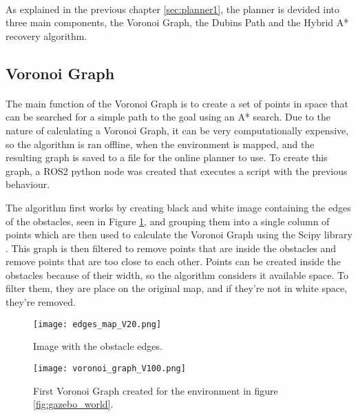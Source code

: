 \paragraph{}As explained in the previous chapter \ref{sec:planner1}, 
the planner is devided into three main components, the Voronoi Graph, the Dubins Path and the Hybrid A* recovery algorithm.

\subsection{Voronoi Graph}
\label{subsec:voronoi_graph}

\paragraph{}The main function of the Voronoi Graph is to create a set of points in space that can be searched for a  
simple path to the goal using an A* search. Due to the nature of calculating a Voronoi Graph, it can be very computationally 
expensive, so the algorithm is ran offline, when the environment is mapped, and the resulting graph is saved to a 
file for the online planner to use. To create this graph, a \gls{ROS2} python node was created that executes a script with 
the previous behaviour.

The algorithm first works by creating black and white image containing the edges of the obstacles, seen in Figure \ref{fig:voronoi_edges}, and grouping them 
into a single column of points which are then used to calculate the Voronoi Graph using the 
Scipy library \cite{Scipy}. 
This graph is then filtered to remove points that are inside the obstacles and remove points that are too close to each other. Points can be created inside the obstacles 
because of their width, so the algorithm considers it available space. To filter them, they are 
place on the original map, and  if they're not in white space, they're removed.
\begin{figure}[h]
    \centering
    \texttt{[image: edges\_map\_V20.png]}
    \caption{Image with the obstacle edges.}
    \label{fig:voronoi_edges}
\end{figure}
\begin{figure}[h]
    \centering
    \texttt{[image: voronoi\_graph\_V100.png]}
    \caption{First Voronoi Graph created for the environment in figure \ref{fig:gazebo_world}.}
    \label{fig:voronoi_graph1}
\end{figure}

